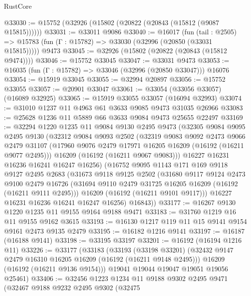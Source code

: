 \begin{lexlean}{RustCore}
\begin{coremodule}
@33030 := @15752 (@32926 (@15802 (@20822 (@20843 (@15812 (@9087 @15815))))))
@33031 := @33011 @9086
@33040 := @16017
    (fun (tail : @2505) => @15783 (fun (Γ : @15782) => @33030 (@32996 (@20850 (@33031 @15815)))))
    @9473
@33045 := @32926 (@15802 (@20822 (@20843 (@15812 @9474))))
@33046 := @15752 @33045
@33047 := @33031 @9473
@33053 := @16035 (fun (Γ : @15782) => @33046 (@32996 (@20850 @33047))) @16076
@33054 := @15919 @33045
@33055 := @32994 @20897
@33056 := @15752 @33055
@33057 := @20901 @33047
@33061 := @33054 (@33056 @33057) (@16089 @32925)
@33065 := @15919 @33055 @33057 (@16094 @32993)
@33074 := @31010 @1237 @11 @4963 @61 @3633 @9085 @9473 @31035 @26966
@33083 := @25628 @1236 @11 @5889 @66 @3633 @9084 @9473 @25655 @22497
@33169 := @32294
    @1220
    @1235
    @11
    @9084
    @9130
    @2495
    @9473
    (@32305
      @9084
      @9095
      @2495
      @9130
      (@32312
        @9084
        @9093
        @2502
        (@32319
          @9083
          @9092
          @2473
          @9066
          @2479
          @31107
          (@17960 @9076 @2479 @17971 @16205 @16209 (@16192 (@16211 @9077 @2495)))
          @16209
          (@16192 (@16211 @9067 @9083)))
        @16227
        @16231
        @16236
        @16241
        @16247
        @16256)
      (@16752
        @9095
        @1143
        @171
        @169
        @9118
        @9127
        @2495
        @2683
        (@31673
          @9118
          @9125
          @2502
          (@31680
            @9117
            @9124
            @2473
            @9100
            @2479
            @16726
            (@31694 @9110 @2479 @31725 @16205 @16209 (@16192 (@16211 @9111 @2495)))
            @16209
            (@16192 (@16211 @9101 @9117)))
          @16227
          @16231
          @16236
          @16241
          @16247
          @16256)
        @16843))
@33177 := @16267 @9130 @1220 @1235 @11 @9155 @9164 @9188 @9471
@33183 := @31760 @1219 @16 @11 @9155 @9162 @3615
@33193 := @16130 @1217 @119 @11 @15 @9141 @9154 @9161 @2473 @9135 @2479
@33195 := @16182 @1216 @9141
@33197 := @16187 (@16188 @9141)
@33198 := @33195 @33197
@33201 := @16192 (@16194 @1216 @11)
@33226 := @33177
    (@33183
      (@33193
        (@33198 @33201)
        (@32432 @9147 @2479 @16310 @16205 @16209 (@16192 (@16211 @9148 @2495)))
        @16209
        (@16192 (@16211 @9136 @9154)))
      @19041
      @19044
      @19047
      @19051
      @19056
      @25461)
@33406 := @32456
    @1223
    @1234
    @11
    @9188
    @9302
    @2495
    @9471
    (@32467
      @9188
      @9232
      @2495
      @9302
      (@32475

\end{coremodule}
\end{lexlean}
